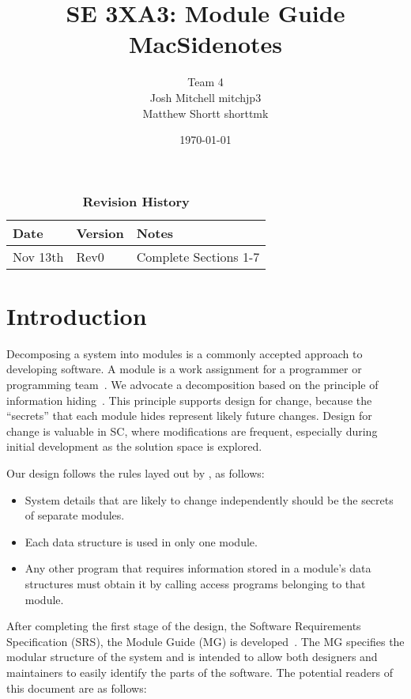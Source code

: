\documentclass[12pt, titlepage]{article}
\title{SE 3XA3: Module Guide\\MacSidenotes}
\author{Team 4
	\\ Josh Mitchell mitchjp3
	\\ Matthew Shortt shorttmk
}
\date{\today}
\begin{document}
\maketitle

\tableofcontents
\listoftables
\listoffigures

\begin{table}[bp]
\caption{\bf Revision History}
\begin{tabularx}{\textwidth}{p{3cm}p{2cm}X}
\toprule {\bf Date} & {\bf Version} & {\bf Notes}\\
\midrule
Nov 13th & Rev0 & Complete Sections 1-7\\
\bottomrule
\end{tabularx}
\end{table}

\newpage


\section{Introduction}

Decomposing a system into modules is a commonly accepted approach to developing
software.  A module is a work assignment for a programmer or programming
team~\citep{ParnasEtAl1984}.  We advocate a decomposition
based on the principle of information hiding~\citep{Parnas1972a}.  This
principle supports design for change, because the ``secrets'' that each module
hides represent likely future changes.  Design for change is valuable in SC,
where modifications are frequent, especially during initial development as the
solution space is explored.  

Our design follows the rules layed out by \citet{ParnasEtAl1984}, as follows:
\begin{itemize}
\item System details that are likely to change independently should be the
  secrets of separate modules.
\item Each data structure is used in only one module.
\item Any other program that requires information stored in a module's data
  structures must obtain it by calling access programs belonging to that module.
\end{itemize}

After completing the first stage of the design, the Software Requirements
Specification (SRS), the Module Guide (MG) is developed~\citep{ParnasEtAl1984}. The MG
specifies the modular structure of the system and is intended to allow both
designers and maintainers to easily identify the parts of the software.  The
potential readers of this document are as follows:
\end{document}
